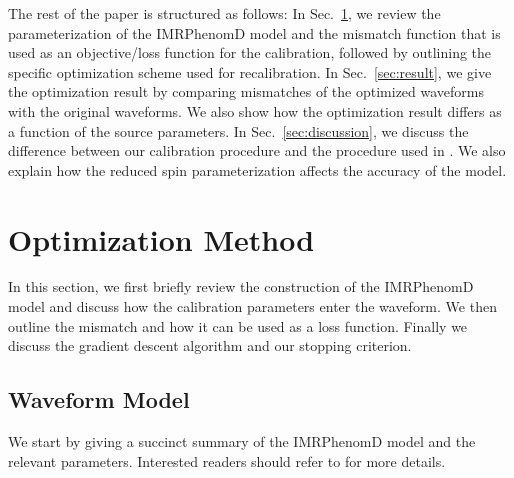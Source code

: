 \documentclass[twocolumn]{aastex631}
\begin{document}
The rest of the paper is structured as follows: In Sec.~\ref{sec:method}, we
review the parameterization of the IMRPhenomD model and the mismatch function
that is used as an objective/loss function for the calibration, followed by outlining the
specific optimization scheme used for recalibration. In
Sec.~\ref{sec:result}, we give the optimization result by comparing mismatches
of the optimized waveforms with the original waveforms. We also show how the
optimization result differs as a function of the source parameters. In
Sec.~\ref{sec:discussion}, we discuss the difference between our calibration
procedure and the procedure used in \citep{khan2016frequency}. We also explain how the reduced spin
parameterization affects the accuracy of the model.

\section{Optimization Method} \label{sec:method}

In this section, we first briefly review the construction of the IMRPhenomD model and discuss
how the calibration parameters enter the waveform.
We then outline the mismatch and how it can be used as a loss function. 
Finally we discuss the gradient descent algorithm and our stopping criterion.

\subsection{Waveform Model} \label{subsec:waveform_model}

We start by giving a succinct summary of the IMRPhenomD model and the relevant parameters.
Interested readers should refer to \citep{khan2016frequency} for more details.
\end{document}
